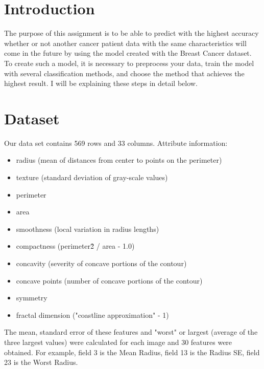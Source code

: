 \documentclass[a4 paper]{article}
\begin{document}

\section{Introduction}
    The purpose of this assignment is to be able to predict with the highest accuracy whether or not another cancer patient data with the same characteristics will come in the future by using the model created with the Breast Cancer dataset. To create such a model, it is necessary to preprocess your data, train the model with several classification methods, and choose the method that achieves the highest result. I will be explaining these steps in detail below.

\section{Dataset}
    Our data set contains 569 rows and 33 columns. Attribute information:
    \begin{itemize}
        \item radius (mean of distances from center to points on the perimeter)
        \item texture (standard deviation of gray-scale values)
        \item perimeter
        \item area
        \item smoothness (local variation in radius lengths)
        \item compactness (perimeter\^2 / area - 1.0)
        \item concavity (severity of concave portions of the contour)
        \item concave points (number of concave portions of the contour)
        \item symmetry
        \item fractal dimension ("coastline approximation" - 1)
    \end{itemize}
    The mean, standard error of these features and "worst" or largest (average of the three largest values) were calculated for each image and 30 features were obtained. For example, field 3 is the Mean Radius, field 13 is the Radius SE, field 23 is the Worst Radius.
\end{document}
